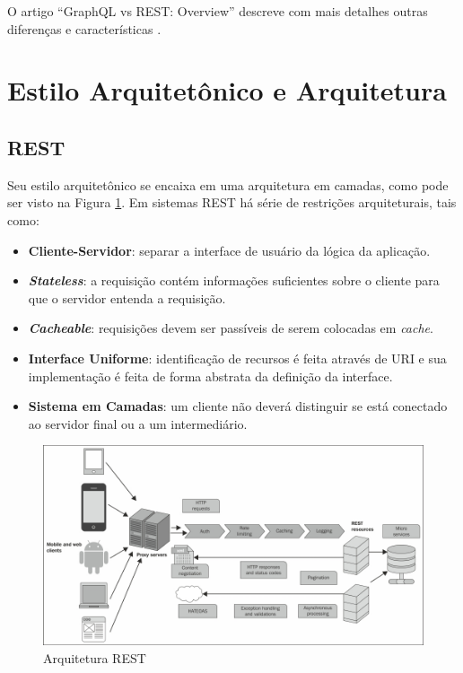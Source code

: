 O artigo ``GraphQL vs REST: Overview'' descreve com mais detalhes outras
diferenças e características \cite{sturgeon:2017}.

\section{Estilo Arquitetônico e
Arquitetura}\label{estilo-arquitetuxf4nico-e-arquitetura}

\subsection{REST}\label{rest}

Seu estilo arquitetônico se encaixa em uma arquitetura em camadas, como
pode ser visto na Figura \ref{fig:rest-arch}. Em sistemas REST há série
de restrições arquiteturais, tais como:

\begin{itemize}
\itemsep1pt\parskip0pt
\item
  \textbf{Cliente-Servidor}: separar a interface de usuário da lógica da
  aplicação.
\item
  \textbf{\emph{Stateless}}: a requisição contém informações suficientes
  sobre o cliente para que o servidor entenda a requisição.
\item
  \textbf{\emph{Cacheable}}: requisições devem ser passíveis de serem
  colocadas em \emph{cache}.
\item
  \textbf{Interface Uniforme}: identificação de recursos é feita através
  de URI e sua implementação é feita de forma abstrata da definição da
  interface.
\item
  \textbf{Sistema em Camadas}: um cliente não deverá distinguir se está
  conectado ao servidor final ou a um intermediário.
\end{itemize}

\begin{figure}[h]
    \centering
    \includegraphics[scale=1.8]{img/rest.jpg}
    \caption{Arquitetura REST}
    \label{fig:rest-arch}
\end{figure}

